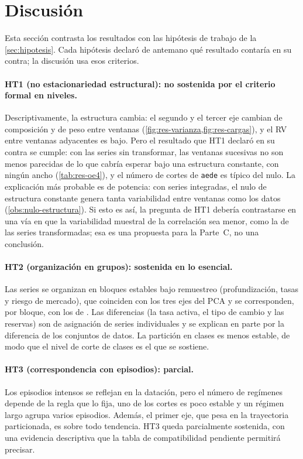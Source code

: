 \section{Discusión}
\label{sec:res-discusion}

Esta sección contrasta los resultados con las hipótesis de trabajo de la \cref{sec:hipotesis}. Cada
hipótesis declaró de antemano qué resultado contaría en su contra; la discusión usa esos criterios.

\paragraph{HT1 (no estacionariedad estructural): no sostenida por el criterio formal en niveles.}
Descriptivamente, la estructura cambia: el segundo y el tercer eje cambian de composición y de
peso entre ventanas (\cref{fig:res-varianza,fig:res-cargas}), y el RV entre ventanas adyacentes es
bajo. Pero el resultado que HT1 declaró en su contra se cumple: con las series sin transformar, las
ventanas sucesivas no son menos parecidas de lo que cabría esperar bajo una estructura constante,
con ningún ancho (\cref{tab:res-oe4}), y el número de cortes de \texttt{aede} es típico del nulo.
La explicación más probable es de potencia: con series integradas, el nulo de estructura constante
genera tanta variabilidad entre ventanas como los datos (\cref{obs:nulo-estructura}). Si esto es
así, la pregunta de HT1 debería contrastarse en una vía en que la variabilidad muestral de la
correlación sea menor, como la de las series transformadas; esa es una propuesta para la Parte~C, no
una conclusión.

\paragraph{HT2 (organización en grupos): sostenida en lo esencial.} Las series se organizan en \clasesHfcMenor{}
bloques estables bajo remuestreo (profundización, tasas y riesgo de mercado), que coinciden con los
tres ejes del PCA y se corresponden, por bloque, con los de \textcite{camiz_cerda_atoche_2026}. Las
diferencias (la tasa activa, el tipo de cambio y las reservas) son de asignación de series
individuales y se explican en parte por la diferencia de los conjuntos de datos. La partición en
\clasesHfcMayor{} clases es menos estable, de modo que el nivel de corte de \clasesHfcMenor{} clases es el que se sostiene.

\paragraph{HT3 (correspondencia con episodios): parcial.} Los episodios intensos se reflejan en la
datación, pero el número de regímenes depende de la regla que lo fija, uno de los cortes es poco
estable y un régimen largo agrupa varios episodios. Además, el primer eje, que pesa en la
trayectoria particionada, es sobre todo tendencia. HT3 queda parcialmente sostenida, con una
evidencia descriptiva que la tabla de compatibilidad pendiente permitirá precisar.

